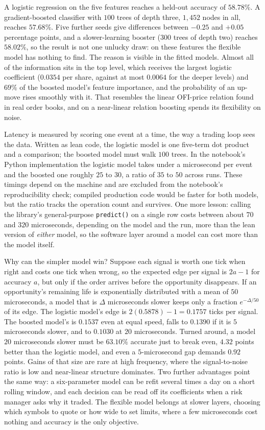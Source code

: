 \documentclass[../ai_in_finance]{subfiles}
\begin{document}
A logistic regression on the five features reaches a held-out accuracy of $58.78\%$. A gradient-boosted classifier with $100$ trees of depth three, $1{,}452$ nodes in all, reaches $57.68\%$. Five further seeds give differences between $-0.25$ and $+0.05$ percentage points, and a slower-learning booster (300 trees of depth two) reaches $58.02\%$, so the result is not one unlucky draw: on these features the flexible model has nothing to find. The reason is visible in the fitted models. Almost all of the information sits in the top level, which receives the largest logistic coefficient ($0.0354$ per share, against at most $0.0064$ for the deeper levels) and $69\%$ of the boosted model's feature importance, and the probability of an up-move rises smoothly with it. That resembles the linear OFI-price relation \textcite{cont2014price} found in real order books, and on a near-linear relation boosting spends its flexibility on noise.

Latency is measured by scoring one event at a time, the way a trading loop sees the data. Written as lean code, the logistic model is one five-term dot product and a comparison; the boosted model must walk $100$ trees. In the notebook's Python implementation the logistic model takes under a microsecond per event and the boosted one roughly $25$ to $30$, a ratio of $35$ to $50$ across runs. These timings depend on the machine and are excluded from the notebook's reproducibility check; compiled production code would be faster for both models, but the ratio tracks the operation count and survives. One more lesson: calling the library's general-purpose \texttt{predict()} on a single row costs between about $70$ and $320$ microseconds, depending on the model and the run, more than the lean version of \emph{either} model, so the software layer around a model can cost more than the model itself.

Why can the simpler model win? Suppose each signal is worth one tick when right and costs one tick when wrong, so the expected edge per signal is $2a-1$ for accuracy $a$, but only if the order arrives before the opportunity disappears. If an opportunity's remaining life is exponentially distributed with a mean of $50$ microseconds, a model that is $\Delta$ microseconds slower keeps only a fraction $e^{-\Delta/50}$ of its edge. The logistic model's edge is $2(0.5878)-1=0.1757$ ticks per signal. The boosted model's is $0.1537$ even at equal speed, falls to $0.1390$ if it is $5$ microseconds slower, and to $0.1030$ at $20$ microseconds. Turned around, a model $20$ microseconds slower must be $63.10\%$ accurate just to break even, $4.32$ points better than the logistic model, and even a $5$-microsecond gap demands $0.92$ points. Gains of that size are rare at high frequency, where the signal-to-noise ratio is low and near-linear structure dominates. Two further advantages point the same way: a six-parameter model can be refit several times a day on a short rolling window, and each decision can be read off its coefficients when a risk manager asks why it traded. The flexible model belongs at slower layers, choosing which symbols to quote or how wide to set limits, where a few microseconds cost nothing and accuracy is the only objective.
\end{document}
